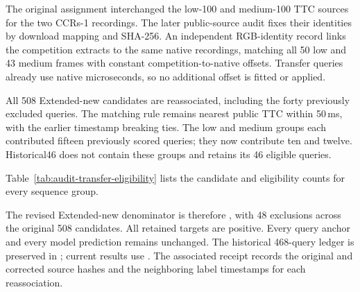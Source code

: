 The original assignment interchanged the low-100 and medium-100 TTC sources for the two CCRs-1 recordings. The later public-source audit fixes their identities by download mapping and SHA-256. An independent RGB-identity record links the competition extracts to the same native recordings, matching all 50 low and 43 medium frames with constant competition-to-native offsets. Transfer queries already use native microseconds, so no additional offset is fitted or applied. 

All 508 Extended-new candidates are reassociated, including the forty previously excluded queries. The matching rule remains nearest public TTC within 50\,ms, with the earlier timestamp breaking ties. The low and medium groups each contributed fifteen previously scored queries; they now contribute ten and twelve. Historical46 does not contain these groups and retains its 46 eligible queries.

Table~\ref{tab:audit-transfer-eligibility} lists the candidate and eligibility counts for every sequence group.

The revised Extended-new denominator is therefore \AuditTransferCount{}, with 48 exclusions across the original 508 candidates. All retained targets are positive. Every query anchor and every model prediction remains unchanged. The historical 468-query ledger is preserved in ; current results use . The associated receipt records the original and corrected source hashes and the neighboring label timestamps for each reassociation. 

